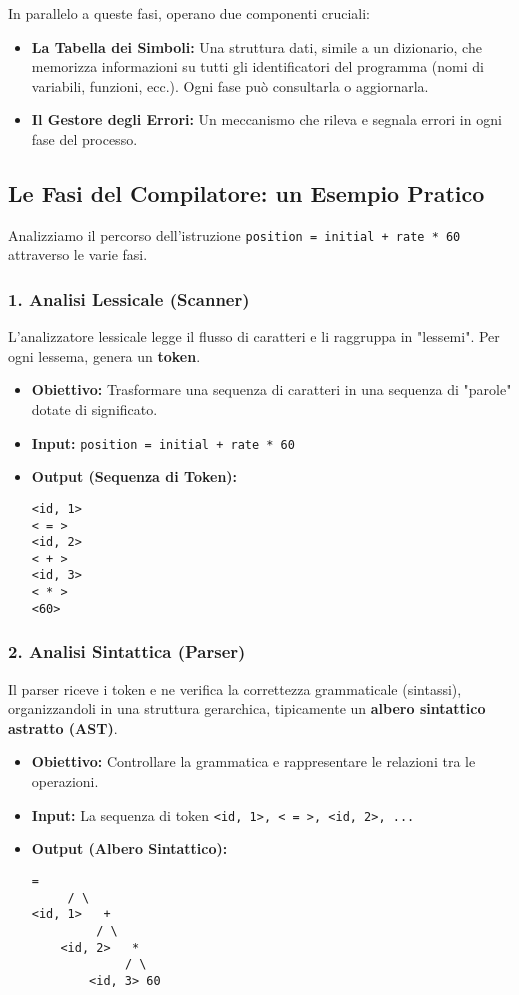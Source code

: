 In parallelo a queste fasi, operano due componenti cruciali:
\begin{itemize}
    \item \textbf{La Tabella dei Simboli:} Una struttura dati, simile a un dizionario, che memorizza informazioni su tutti gli identificatori del programma (nomi di variabili, funzioni, ecc.). Ogni fase può consultarla o aggiornarla.
    \item \textbf{Il Gestore degli Errori:} Un meccanismo che rileva e segnala errori in ogni fase del processo.
\end{itemize}

\subsection{Le Fasi del Compilatore: un Esempio Pratico}
Analizziamo il percorso dell'istruzione \texttt{position = initial + rate * 60} attraverso le varie fasi.

\subsubsection{1. Analisi Lessicale (Scanner)}
L'analizzatore lessicale legge il flusso di caratteri e li raggruppa in "lessemi". Per ogni lessema, genera un \textbf{token}.
\begin{itemize}
    \item \textbf{Obiettivo:} Trasformare una sequenza di caratteri in una sequenza di "parole" dotate di significato.
    \item \textbf{Input:} \texttt{position = initial + rate * 60}
    \item \textbf{Output (Sequenza di Token):}
    \begin{verbatim}
<id, 1>
< = >
<id, 2>
< + >
<id, 3>
< * >
<60>
    \end{verbatim}
\end{itemize}

\subsubsection{2. Analisi Sintattica (Parser)}
Il parser riceve i token e ne verifica la correttezza grammaticale (sintassi), organizzandoli in una struttura gerarchica, tipicamente un \textbf{albero sintattico astratto (AST)}.
\begin{itemize}
    \item \textbf{Obiettivo:} Controllare la grammatica e rappresentare le relazioni tra le operazioni.
    \item \textbf{Input:} La sequenza di token \texttt{<id, 1>, < = >, <id, 2>, ...}
    \item \textbf{Output (Albero Sintattico):}
    \begin{Verbatim}[frame=single, label=Albero Sintattico Astratto (AST)]
      =
     / \
<id, 1>   +
         / \
    <id, 2>   *
             / \
        <id, 3> 60
    \end{Verbatim}
\end{itemize}

